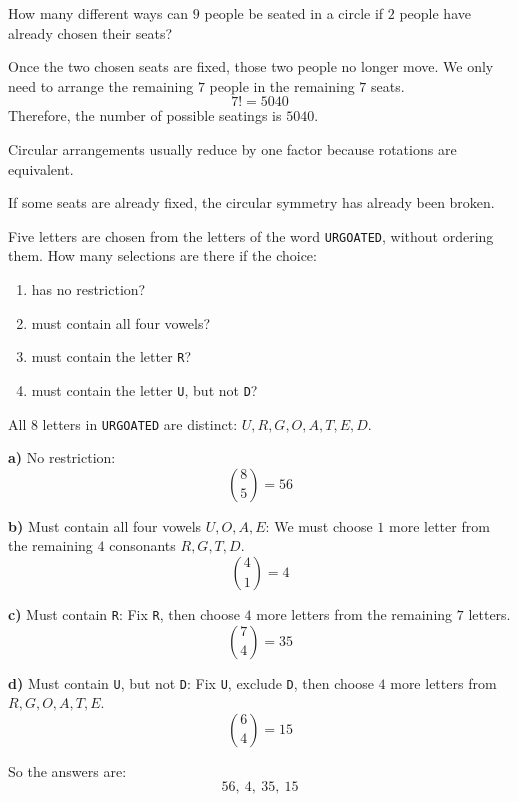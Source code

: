 \begin{problem}
How many different ways can $9$ people be seated in a circle if $2$ people have already chosen their seats?
\end{problem}

\begin{solution}
Once the two chosen seats are fixed, those two people no longer move. We only need to arrange the remaining $7$ people in the remaining $7$ seats.
\[
7! = 5040
\]
Therefore, the number of possible seatings is $\boxed{5040}$.
\end{solution}

\begin{takeaways}
\item Circular arrangements usually reduce by one factor because rotations are equivalent.
\item If some seats are already fixed, the circular symmetry has already been broken.
\end{takeaways}

\begin{problem}
Five letters are chosen from the letters of the word \texttt{URGOATED}, without ordering them. How many selections are there if the choice:
\begin{enumerate}[label=\alph*)]
\item has no restriction?
\item must contain all four vowels?
\item must contain the letter \texttt{R}?
\item must contain the letter \texttt{U}, but not \texttt{D}?
\end{enumerate}
\end{problem}

\begin{solution}
All $8$ letters in \texttt{URGOATED} are distinct: $U, R, G, O, A, T, E, D$.

\textbf{a)} No restriction:
\[
\binom{8}{5} = 56
\]

\textbf{b)} Must contain all four vowels $U, O, A, E$:
We must choose $1$ more letter from the remaining $4$ consonants $R, G, T, D$.
\[
\binom{4}{1} = 4
\]

\textbf{c)} Must contain \texttt{R}:
Fix \texttt{R}, then choose $4$ more letters from the remaining $7$ letters.
\[
\binom{7}{4} = 35
\]

\textbf{d)} Must contain \texttt{U}, but not \texttt{D}:
Fix \texttt{U}, exclude \texttt{D}, then choose $4$ more letters from $R, G, O, A, T, E$.
\[
\binom{6}{4} = 15
\]

So the answers are:
\[
\boxed{56,\ 4,\ 35,\ 15}
\]
\end{solution}

